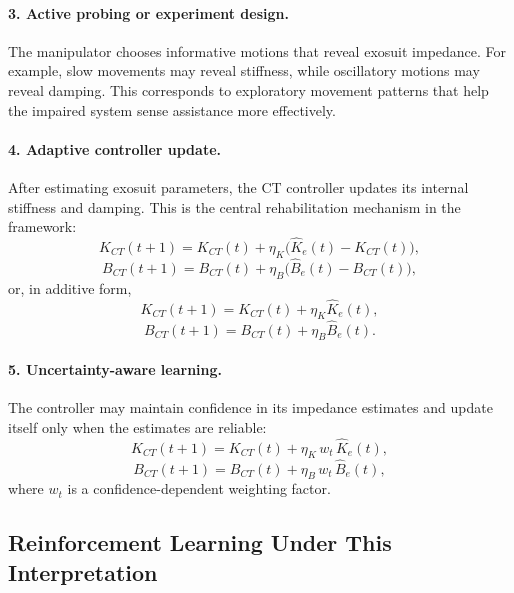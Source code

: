 \documentclass[11pt]{article}
\begin{document}
\paragraph{3. Active probing or experiment design.}
The manipulator chooses informative motions that reveal exosuit impedance. For example, slow movements may reveal stiffness, while oscillatory motions may reveal damping. This corresponds to exploratory movement patterns that help the impaired system sense assistance more effectively.

\paragraph{4. Adaptive controller update.}
After estimating exosuit parameters, the CT controller updates its internal stiffness and damping. This is the central rehabilitation mechanism in the framework:
\begin{equation}
K_{CT}(t+1)=K_{CT}(t)+\eta_K\bigl(\hat{K}_e(t)-K_{CT}(t)\bigr),
\end{equation}
\begin{equation}
B_{CT}(t+1)=B_{CT}(t)+\eta_B\bigl(\hat{B}_e(t)-B_{CT}(t)\bigr),
\end{equation}
or, in additive form,
\begin{equation}
K_{CT}(t+1)=K_{CT}(t)+\eta_K \hat{K}_e(t),
\end{equation}
\begin{equation}
B_{CT}(t+1)=B_{CT}(t)+\eta_B \hat{B}_e(t).
\end{equation}

\paragraph{5. Uncertainty-aware learning.}
The controller may maintain confidence in its impedance estimates and update itself only when the estimates are reliable:
\begin{equation}
K_{CT}(t+1)=K_{CT}(t)+\eta_K\, w_t\, \hat{K}_e(t),
\end{equation}
\begin{equation}
B_{CT}(t+1)=B_{CT}(t)+\eta_B\, w_t\, \hat{B}_e(t),
\end{equation}
where \(w_t\) is a confidence-dependent weighting factor.

\subsection{Reinforcement Learning Under This Interpretation}
\end{document}
